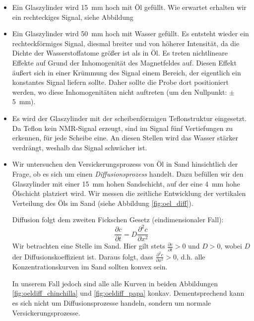 \documentclass[a4paper]{scrartcl} %
\begin{document}
\begin{itemize}
	\item Ein Glaszylinder wird \SI{15}{mm} hoch mit Öl gefüllt. Wie erwartet erhalten wir ein rechteckiges Signal, siehe Abbildung
	\item Ein Glaszylinder wird \SI{50}{mm} hoch mit Wasser gefüllt. Es entsteht wieder ein rechteckförmiges Signal, diesmal breiter und von höherer Intensität, da die Dichte der Wasserstoffatome größer ist als in Öl. Es treten nichtlineare Effekte auf Grund der Inhomogenität des Magnetfeldes auf. Diesen Effekt äußert sich in einer Krümmung des Signal einem Bereich, der eigentlich ein konstantes Signal liefern sollte. Daher sollte die Probe dort positioniert werden, wo diese Inhomogenitäten nicht auftreten (um den Nullpunkt: $\pm$ \SI{5}{mm}).
	\item Es wird der Glaszylinder mit der scheibenförmigen Teflonstruktur eingesetzt. Da Teflon kein NMR-Signal erzeugt, sind im Signal fünf Vertiefungen zu erkennen, für jede Scheibe eine. An diesen Stellen wird das Wasser stärker verdrängt, weshalb das Signal schwächer ist.
	\item Wir untersuchen den Versickerungsprozess von Öl in Sand hinsichtlich der Frage, ob es sich um einen \emph{Diffusionsprozess} handelt. Dazu befüllen wir den Glaszylinder mit einer \SI{15}{mm} hohen Sandschicht, auf der eine \SI{4}{mm} hohe Ölschicht platziert wird. Wir messen die zeitliche Entwicklung der vertikalen Verteilung des Öls im Sand (siehe Abbildung \ref{fig:oel_diff}).
	
	Diffusion folgt dem zweiten Fickschen Gesetz (eindimensionaler Fall):
	\begin{equation}
		\frac{\partial c}{\partial t} = D \frac{\partial^2 c}{\partial x^2}
	\end{equation}
	Wir betrachten eine Stelle im Sand. Hier gilt stets $\tfrac{\partial c}{\partial t} > 0$ und $D > 0$, wobei $D$ der Diffusionskoeffizient ist. Daraus folgt, dass $\tfrac{\partial^2 c}{\partial x^2} > 0$, d.h. alle Konzentrationskurven im Sand sollten konvex sein.
	
	In unserem Fall jedoch sind alle alle Kurven in beiden Abbildungen \ref{fig:oeldiff_chinchilla} und \ref{fig:oeldiff_papa} konkav. Dementsprechend kann es sich nicht um Diffusionsprozesse handeln, sondern um normale Versickerungsprozesse.
\end{itemize}
\end{document}
